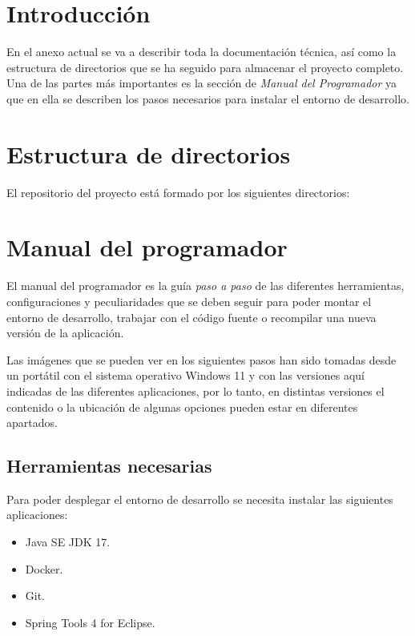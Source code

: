 
\section{Introducción}

En el anexo actual se va a describir toda la documentación técnica, así como la estructura de directorios que se ha seguido para almacenar el proyecto completo.
Una de las partes más importantes es la sección de \textit{Manual del Programador} ya que en ella se describen los pasos necesarios para instalar el entorno de desarrollo. 

\section{Estructura de directorios}

El repositorio del proyecto está formado por los siguientes directorios:

\section{Manual del programador}

El manual del programador es la guía \textit{paso a paso} de las diferentes herramientas, configuraciones y peculiaridades que se deben seguir para poder montar el entorno de desarrollo, trabajar con el código fuente o recompilar una nueva versión de la aplicación.

Las imágenes que se pueden ver en los siguientes pasos han sido tomadas desde un portátil con el sistema operativo Windows 11 y con las versiones aquí indicadas de las diferentes aplicaciones, por lo tanto, en distintas versiones el contenido o la ubicación de algunas opciones pueden estar en diferentes apartados.

\subsection{Herramientas necesarias}

Para poder desplegar el entorno de desarrollo se necesita instalar las siguientes aplicaciones:

\begin{itemize}
	\item Java SE JDK 17.
	\item Docker.
	\item Git.
	\item Spring Tools 4 for Eclipse.
\end{itemize}

